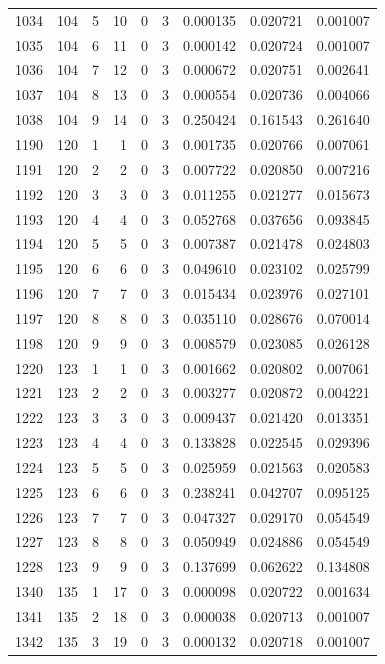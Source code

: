 \begin{longtable}{rrrrrrrrr}
1034 & 104 & 5 & 10 & 0 & 3 & 0.000135 & 0.020721 & 0.001007 \\
1035 & 104 & 6 & 11 & 0 & 3 & 0.000142 & 0.020724 & 0.001007 \\
1036 & 104 & 7 & 12 & 0 & 3 & 0.000672 & 0.020751 & 0.002641 \\
1037 & 104 & 8 & 13 & 0 & 3 & 0.000554 & 0.020736 & 0.004066 \\
1038 & 104 & 9 & 14 & 0 & 3 & 0.250424 & 0.161543 & 0.261640 \\
1190 & 120 & 1 & 1 & 0 & 3 & 0.001735 & 0.020766 & 0.007061 \\
1191 & 120 & 2 & 2 & 0 & 3 & 0.007722 & 0.020850 & 0.007216 \\
1192 & 120 & 3 & 3 & 0 & 3 & 0.011255 & 0.021277 & 0.015673 \\
1193 & 120 & 4 & 4 & 0 & 3 & 0.052768 & 0.037656 & 0.093845 \\
1194 & 120 & 5 & 5 & 0 & 3 & 0.007387 & 0.021478 & 0.024803 \\
1195 & 120 & 6 & 6 & 0 & 3 & 0.049610 & 0.023102 & 0.025799 \\
1196 & 120 & 7 & 7 & 0 & 3 & 0.015434 & 0.023976 & 0.027101 \\
1197 & 120 & 8 & 8 & 0 & 3 & 0.035110 & 0.028676 & 0.070014 \\
1198 & 120 & 9 & 9 & 0 & 3 & 0.008579 & 0.023085 & 0.026128 \\
1220 & 123 & 1 & 1 & 0 & 3 & 0.001662 & 0.020802 & 0.007061 \\
1221 & 123 & 2 & 2 & 0 & 3 & 0.003277 & 0.020872 & 0.004221 \\
1222 & 123 & 3 & 3 & 0 & 3 & 0.009437 & 0.021420 & 0.013351 \\
1223 & 123 & 4 & 4 & 0 & 3 & 0.133828 & 0.022545 & 0.029396 \\
1224 & 123 & 5 & 5 & 0 & 3 & 0.025959 & 0.021563 & 0.020583 \\
1225 & 123 & 6 & 6 & 0 & 3 & 0.238241 & 0.042707 & 0.095125 \\
1226 & 123 & 7 & 7 & 0 & 3 & 0.047327 & 0.029170 & 0.054549 \\
1227 & 123 & 8 & 8 & 0 & 3 & 0.050949 & 0.024886 & 0.054549 \\
1228 & 123 & 9 & 9 & 0 & 3 & 0.137699 & 0.062622 & 0.134808 \\
1340 & 135 & 1 & 17 & 0 & 3 & 0.000098 & 0.020722 & 0.001634 \\
1341 & 135 & 2 & 18 & 0 & 3 & 0.000038 & 0.020713 & 0.001007 \\
1342 & 135 & 3 & 19 & 0 & 3 & 0.000132 & 0.020718 & 0.001007 \\

\end{longtable}

